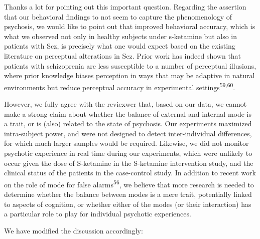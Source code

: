 \documentclass[
]{article}
\begin{document}
Thanks a lot for pointing out this important question. Regarding the
assertion that our behavioral findings to not seem to capture the
phenomenology of psychosis, we would like to point out that improved
behavioral accuracy, which is what we observed not only in healthy
subjects under s-ketamine but also in patients with Scz, is precisely
what one would expect based on the existing literature on perceptual
alterations in Scz. Prior work has indeed shown that patients with
schizoprenia are less susceptible to a number of perceptual illusions,
where prior knowledge biases perception in ways that may be adaptive in
natural environments but reduce perceptual accuracy in experimental
settings\textsuperscript{59,60}.

However, we fully agree with the reviexwer that, based on our data, we
cannot make a strong claim about whether the balance of external and
internal mode is a trait, or is (also) related to the state of
psychosis. Our experiments maximized intra-subject power, and were not
designed to detect inter-individual differences, for which much larger
samples would be required. Likewise, we did not monitor psychotic
experience in real time during our experiments, which were unlikely to
occur given the dose of S-ketamine in the S-ketamine intervention study,
and the clinical status of the patients in the case-control study. In
addition to recent work on the role of mode for false
alarms\textsuperscript{56}, we believe that more research is needed to
determine whether the balance between modes is a mere trait, potentially
linked to aspects of cognition, or whether either of the modes (or their
interaction) has a particular role to play for individual psychotic
experiences.

We have modified the discussion accordingly:
\end{document}
